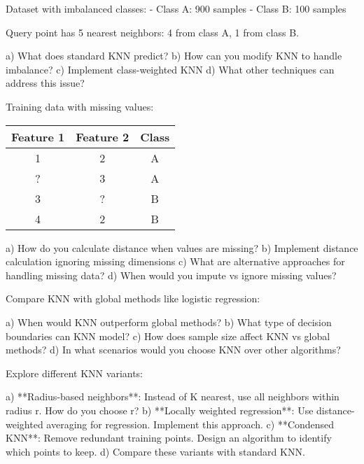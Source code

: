 \documentclass{article}
\newcounter{exercise}
\begin{document}
\begin{tcolorbox}[colback=gray!5!white,colframe=gray!75!black,title=Problem \stepcounter{exercise}: Imbalanced Datasets]

Dataset with imbalanced classes:
- Class A: 900 samples
- Class B: 100 samples

Query point has 5 nearest neighbors: 4 from class A, 1 from class B.

a) What does standard KNN predict?
b) How can you modify KNN to handle imbalance?
c) Implement class-weighted KNN
d) What other techniques can address this issue?
\end{tcolorbox}

\begin{tcolorbox}[colback=gray!5!white,colframe=gray!75!black,title=Problem \stepcounter{exercise}: Missing Values]

Training data with missing values:
\begin{center}
\begin{tabular}{|c|c|c|}
\hline
Feature 1 & Feature 2 & Class \\
\hline
1 & 2 & A \\
? & 3 & A \\
3 & ? & B \\
4 & 2 & B \\
\hline
\end{tabular}
\end{center}

a) How do you calculate distance when values are missing?
b) Implement distance calculation ignoring missing dimensions
c) What are alternative approaches for handling missing data?
d) When would you impute vs ignore missing values?
\end{tcolorbox}

\begin{tcolorbox}[colback=gray!5!white,colframe=gray!75!black,title=Problem \stepcounter{exercise}: Local vs Global Methods]

Compare KNN with global methods like logistic regression:

a) When would KNN outperform global methods?
b) What type of decision boundaries can KNN model?
c) How does sample size affect KNN vs global methods?
d) In what scenarios would you choose KNN over other algorithms?
\end{tcolorbox}

\begin{tcolorbox}[colback=gray!5!white,colframe=gray!75!black,title=Problem \stepcounter{exercise}: KNN Variants]

Explore different KNN variants:

a) **Radius-based neighbors**: Instead of K nearest, use all neighbors within radius r. How do you choose r?
b) **Locally weighted regression**: Use distance-weighted averaging for regression. Implement this approach.
c) **Condensed KNN**: Remove redundant training points. Design an algorithm to identify which points to keep.
d) Compare these variants with standard KNN.
\end{tcolorbox}
\end{document}

